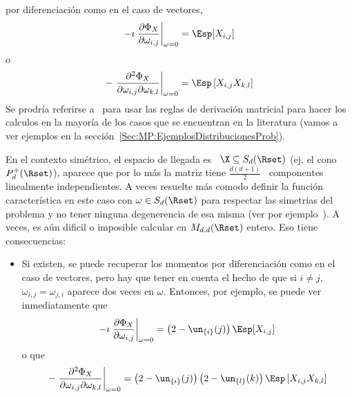 \begin{itemize}
  por  diferenciaci\'on   como  en  el  caso  de   vectores,
  \[
  -\imath \left. \frac{\partial \Phi_X}{\partial \omega_{i,j}} \right|_{\omega =
    0} = \Esp[X_{i,j}]
  \]
  o
  \[
  - \left. \frac{\partial^2 \Phi_X}{\partial \omega_{i,j} \partial \omega_{k,l}}
  \right|_{\omega = 0} = \Esp\left[ X_{i,j} X_{k,l} \right]
  \]
  Se  prodr\'ia  referirse a~\cite[Cap.~8]{MagNeu99}  para  usar  las reglas  de
  derivaci\'on matricial  para hacer los calculos  en la mayor\'ia  de los casos
  que   se  encuentran  en   la  literatura   (vamos  a   ver  ejemplos   en  la
  secci\'on~\ref{Sec:MP:EjemplosDistribucionesProb}).
\end{itemize}





\label{Sssec:MP:MatricesAleatoriasSimetrico}

En  el contexto  sim\'etrico,  \ie el  espacio  de llegada  es  \ $\X  \subseteq
S_d(\Rset)$ (ej.   el cono $P_d^+(\Rset)$), aparece  que por lo  m\'as la matriz
tiene  $\frac{d (d+1)}{2}$  \  componentes linealmente  independientes. A  veces
resuelte m\'as  comodo definir  la funci\'on caracter\'istica  en este  caso con
$\omega \in  S_d(\Rset)$ para  respectar las simetrias  del problema y  no tener
ninguna degenerencia  de esa misma (ver por  ejemplo~\cite{PedRic91, And03}).  A
veces, es a\'un  dificil o imposible calcular en  $\\M_{d,d}(\Rset)$ entero. Eso
tiene consecuencias:
%
\begin{itemize}
\item Si existen,  se puede recuperar los momentos  por diferenciaci\'on como en
  el caso de  vectores, pero hay que tener  en cuenta el hecho de que  si $i \ne
  j$, $\omega_{i,j} = \omega_{j,i}$ aparece dos veces en $\omega$. Entonces, por
  ejemplo, se puede ver inmediatamente que
  \[
  -\imath \left. \frac{\partial \Phi_X}{\partial \omega_{i,j}} \right|_{\omega =
    0} = \left( 2 - \un_{\{i\}}(j) \right) \Esp[X_{i,j}]
  \]
  o que
  \[
  - \left. \frac{\partial^2 \Phi_X}{\partial \omega_{i,j} \partial \omega_{k,l}}
  \right|_{\omega  =  0}  =  \left(  2  -  \un_{\{i\}}(j)  \right)  \left(  2  -
    \un_{\{l\}}(k) \right) \Esp\left[ X_{i,j} X_{k,l} \right]
  \]
\end{itemize}
